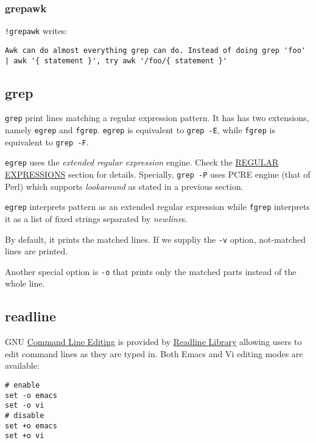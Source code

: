\subsubsection{grepawk}
\label{sec:grepawk}

\verb|!grepawk| writes:

\begin{lstlisting}
Awk can do almost everything grep can do. Instead of doing grep 'foo' | awk '{ statement }', try awk '/foo/{ statement }'
\end{lstlisting}

\subsection{grep}
\label{sec:bash-grep}

\lstinline|grep| print lines matching a regular expression
pattern. It has has two extensions, namely \lstinline|egrep| and
\lstinline|fgrep|. \lstinline|egrep| is equivalent to
\lstinline|grep -E|, while \lstinline|fgrep| is equivalent to
\lstinline|grep -F|.

\lstinline|egrep| uses the \textit{extended regular expression}
engine. Check the \uline{REGULAR EXPRESSIONS} section for
details. Specially, \lstinline|grep -P| uses PCRE engine (that of
Perl) which supports \textit{lookaround} as stated in a previous
section.

\lstinline|egrep| interprets pattern as an extended regular
expression while \lstinline|fgrep| interprets it as a list of
fixed strings separated by \textit{newline}s.

By default, it prints the matched lines. If we suppliy the
\lstinline|-v| option, not-matched lines are printed.

Another special option is \lstinline|-o| that prints only the
matched parts instead of the whole line.

\subsection{readline}
\label{sec:gnu-readline}

GNU
\href{https://www.gnu.org/software/bash/manual/bash.html#Command-Line-Editing}{Command
  Line Editing} is provided by
\href{https://tiswww.case.edu/php/chet/readline/rltop.html}{Readline
  Library} allowing users to edit command lines as they are typed
in. Both Emacs and Vi editing modes are available:

\begin{minipage}{1.0\linewidth}
\begin{lstlisting}
# enable
set -o emacs
set -o vi
# disable
set +o emacs
set +o vi
\end{lstlisting}
\end{minipage}

